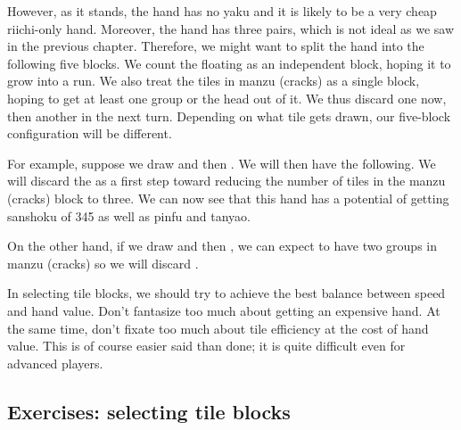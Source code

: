 \bigskip
However, as it stands, the hand has no {\jap yaku} and it is likely to be a very cheap riichi-only hand. Moreover, the hand has three pairs, which is not ideal as we saw in the previous chapter. 
Therefore, we might want to split the hand into the following five blocks. 
\emj
We count the floating {\LARGE{}} as an independent block, hoping it to grow into a run. We also treat the tiles in {\jap manzu} (cracks) as a single block, hoping to get at least one group or the head out of it. We thus discard one {\LARGE{}} now, then another {\LARGE{}} in the next turn. Depending on what tile gets drawn, our five-block configuration will be different. 

\bigskip
For example, suppose we draw {\LARGE{}} and then {\LARGE{}}. We will then have the following. 
\emj
We will discard the {\LARGE{}} as a first step toward reducing the number of tiles in the {\jap manzu} (cracks) block to three. We can now see that this hand has a potential of getting {\jap sanshoku} of 345 as well as {\jap pinfu} and {\jap tanyao}.

\bigskip
On the other hand, if we draw {\LARGE{}} and then {\LARGE{}}, we can expect to have two groups in {\jap manzu} (cracks) so we will discard {\LARGE{}}.
\emj
\vspace{-10pt}

In selecting tile blocks, we should try to achieve the best balance between speed and hand value. Don't fantasize too much about getting an expensive hand. At the same time, don't fixate too much about tile efficiency at the cost of hand value. This is of course easier said than done; it is quite difficult even for advanced players. 

\vfill

\subsection*{Exercises: selecting tile blocks}

